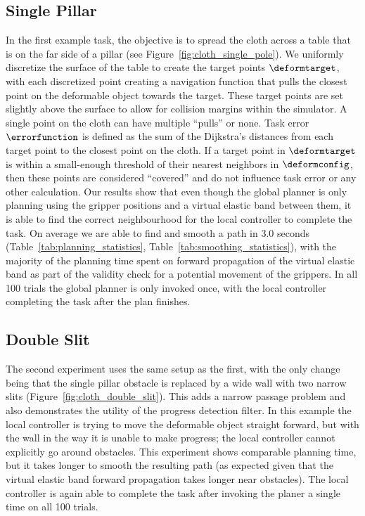 \subsection{Single Pillar}
\label{sec:single_pillar}









In the first example task, the objective is to spread the cloth across a table that is on the far side  of a pillar (see Figure~\ref{fig:cloth_single_pole}). We uniformly discretize the surface of the table to create the target points $\deformtarget$, with each discretized point creating a navigation function that pulls the closest point on the deformable object towards the target. These target points are set slightly above the surface to allow for collision margins within the simulator. A single point on the cloth can have multiple ``pulls'' or none. Task error $\errorfunction$ is defined as the sum of the Dijkstra's distances from each target point to the closest point on the cloth. If a target point in $\deformtarget$ is within a small-enough threshold of their nearest neighbors in $\deformconfig$, then these points are considered ``covered'' and do not influence task error or any other calculation. Our results show that even though the global planner is only planning using the gripper positions and a virtual elastic band between them, it is able to find the correct neighbourhood for the local controller to complete the task. On average we are able to find and smooth a path in 3.0 seconds (Table~\ref{tab:planning_statistics}, Table~\ref{tab:smoothing_statistics}), with the majority of the planning time spent on forward propagation of the virtual elastic band as part of the validity check for a potential movement of the grippers. In all 100 trials the global planner is only invoked once, with the local controller completing the task after the plan finishes.









\subsection{Double Slit}


The second experiment uses the same setup as the first, with the only change being that the single pillar obstacle is replaced by a wide wall with two narrow slits (Figure~\ref{fig:cloth_double_slit}). This adds a narrow passage problem and also demonstrates the utility of the progress detection filter. In this example the local controller is trying to move the deformable object straight forward, but with the wall in the way it is unable to make progress; the local controller cannot explicitly go around obstacles. This experiment shows comparable planning time, but it takes longer to smooth the resulting path (as expected given that the virtual elastic band forward propagation takes longer near obstacles). The local controller is again able to complete the task after invoking the planer a single time on all 100 trials.



